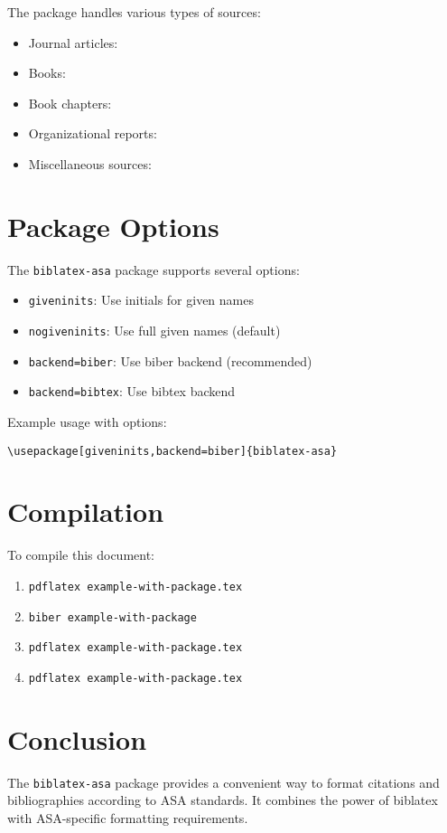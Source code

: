 \documentclass{article}
\begin{document}
The package handles various types of sources:
\begin{itemize}
    \item Journal articles: \parencite{brown2022}
    \item Books: \parencite{johnson2019}
    \item Book chapters: \parencite{wilson2021}
    \item Organizational reports: \parencite{WHO2022}
    \item Miscellaneous sources: \parencite{ASA1997}
\end{itemize}

\section{Package Options}

The \texttt{biblatex-asa} package supports several options:

\begin{itemize}
    \item \texttt{giveninits}: Use initials for given names
    \item \texttt{nogiveninits}: Use full given names (default)
    \item \texttt{backend=biber}: Use biber backend (recommended)
    \item \texttt{backend=bibtex}: Use bibtex backend
\end{itemize}

Example usage with options:
\begin{verbatim}
\usepackage[giveninits,backend=biber]{biblatex-asa}
\end{verbatim}

\section{Compilation}

To compile this document:
\begin{enumerate}
    \item \texttt{pdflatex example-with-package.tex}
    \item \texttt{biber example-with-package}
    \item \texttt{pdflatex example-with-package.tex}
    \item \texttt{pdflatex example-with-package.tex}
\end{enumerate}

\section{Conclusion}

The \texttt{biblatex-asa} package provides a convenient way to format citations and bibliographies according to ASA standards. It combines the power of biblatex with ASA-specific formatting requirements.

\printbibliography
\end{document}

